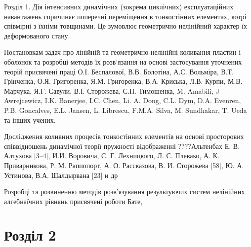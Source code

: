 \documentclass[8pt]{beamer}
\numberwithin{figure}{section}
\numberwithin{equation}{section}
\begin{document}
\begin{frame}{Розділ 1.}
Дія інтенсивних динамічних (зокрема циклічних) експлуатаційних навантажень спричиняє поперечні переміщення в тонкостінних елементах, котрі співмірні з їхніми товщинами. Це зумовлює геометрично нелінійний характер їх деформованого стану. 
\medskip 

Постановкам задач про лінійній та геометрично нелінійні коливання пластин і оболонок та розробці методів їх розв'язання на основі застосування уточнених теорій присвячені праці О.І. Беспалової, В.В. Болотіна, А.С. Вольміра, В.Т. Грінченка, О.Я. Григоренка, Я.М. Григоренка, В.А. Криська, Л.В. Курпи, М.В. Марчука, Я.Г. Савули, В.І. Сторожева, С.П. Тимошенка, M. Amabili, J Awrejcewicz, I.K. Banerjee, I.C. Chen, Li. A. Dong, C.L. Dym, D.A. Evenren, P.B. Goncalves, E.L. Jansen, L. Librescu, F.M.A. Silva, M. Sundhakar, T. Ueda та інших учених.
\medskip 

Дослідження коливних процесів тонкостінних елементів на основі просторових співвідношень динамічної теорії пружності відображенні ????Альтенбах Е. В. Алтухова [3–4], И.И. Воровича, С. Г. Лехницкого, Л. С. Плевако, А. К. Приварникова, Р. М. Раппопорт, А. О. Рассказова, В. И. Сторожева [58], Ю. А. Устинова, В.А. Шалдырвана [23] и др

\medskip 
Розробці та розвиненню методів розв'язування результуючих систем  нелінійних алгебнаїчних рівнянь присвячені роботи Бате,


\end{frame}

\section{Розділ 2}
\end{document}
